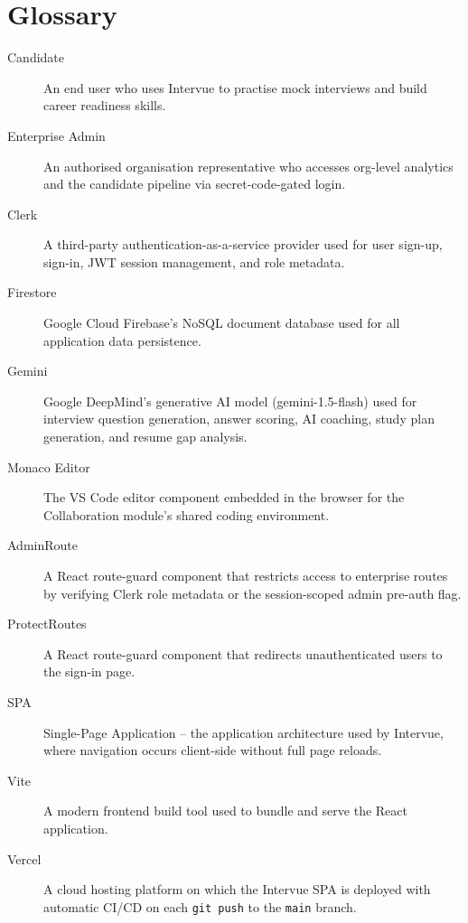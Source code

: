\documentclass{fisatinternship}
\begin{document}
\section{Glossary}
\begin{description}
  \item[Candidate] An end user who uses Intervue to practise mock interviews and build
        career readiness skills.
  \item[Enterprise Admin] An authorised organisation representative who accesses
        org-level analytics and the candidate pipeline via secret-code-gated login.
  \item[Clerk] A third-party authentication-as-a-service provider used for user
        sign-up, sign-in, JWT session management, and role metadata.
  \item[Firestore] Google Cloud Firebase's NoSQL document database used for all
        application data persistence.
  \item[Gemini] Google DeepMind's generative AI model (gemini-1.5-flash) used for
        interview question generation, answer scoring, AI coaching, study plan generation,
        and resume gap analysis.
  \item[Monaco Editor] The VS Code editor component embedded in the browser for the
        Collaboration module's shared coding environment.
  \item[AdminRoute] A React route-guard component that restricts access to enterprise
        routes by verifying Clerk role metadata or the session-scoped admin pre-auth flag.
  \item[ProtectRoutes] A React route-guard component that redirects unauthenticated
        users to the sign-in page.
  \item[SPA] Single-Page Application -- the application architecture used by Intervue,
        where navigation occurs client-side without full page reloads.
  \item[Vite] A modern frontend build tool used to bundle and serve the React application.
  \item[Vercel] A cloud hosting platform on which the Intervue SPA is deployed with
        automatic CI/CD on each \texttt{git push} to the \texttt{main} branch.
\end{description}
\end{document}

